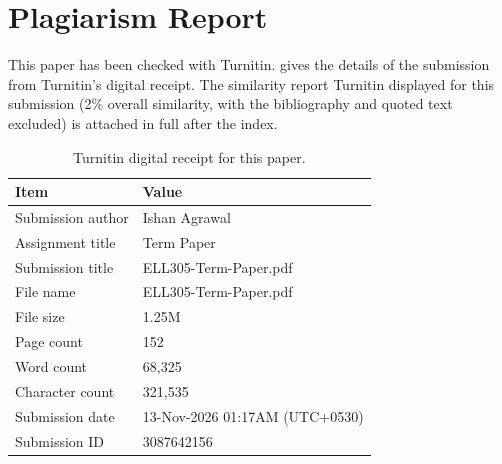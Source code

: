 \clearpage
\appendix
\section{Plagiarism Report}
\label{app:plagiarism-report}

This paper has been checked with Turnitin.  gives the details of the submission from Turnitin's digital receipt. The similarity report Turnitin displayed for this submission (2\% overall similarity, with the bibliography and quoted text excluded) is attached in full after the index.

\begin{table}[htbp]
    \centering
    \caption[Turnitin digital receipt]{Turnitin digital receipt for this paper.}
    \label{tab:turnitin-receipt}
    \begin{tabular}{@{}ll@{}}
        \toprule
        \textbf{Item} & \textbf{Value} \\
        \midrule
        Submission author & Ishan Agrawal \\
        Assignment title & Term Paper \\
        Submission title & ELL305-Term-Paper.pdf \\
        File name & ELL305-Term-Paper.pdf \\
        File size & 1.25M \\
        Page count & 152 \\
        Word count & 68,325 \\
        Character count & 321,535 \\
        Submission date & 13-Nov-2026 01:17AM (UTC+0530) \\
        Submission ID & 3087642156 \\
        \bottomrule
    \end{tabular}
\end{table}
